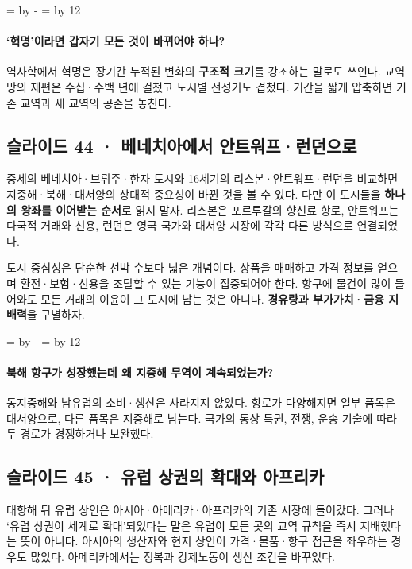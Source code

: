 \documentclass[10pt,a4paper]{article}
\newcommand{\ReserveQuestionSpace}{%
  \par\begingroup
  \dimen0=\pagegoal \advance\dimen0 by -\pagetotal
  \dimen2=\baselineskip \multiply\dimen2 by 12
  \ifdim\dimen0<\dimen2 \newpage\fi
  \endgroup}
\begin{document}
\ReserveQuestionSpace
\paragraph{‘혁명’이라면 갑자기 모든 것이 바뀌어야 하나?}
역사학에서 혁명은 장기간 누적된 변화의 \textbf{구조적 크기}를 강조하는 말로도 쓰인다. 교역망의 재편은 수십·수백 년에 걸쳤고 도시별 전성기도 겹쳤다. 기간을 짧게 압축하면 기존 교역과 새 교역의 공존을 놓친다.\par

\subsection{슬라이드 44 · 베네치아에서 안트워프·런던으로}
중세의 베네치아·브뤼주·한자 도시와 16세기의 리스본·안트워프·런던을 비교하면 지중해·북해·대서양의 상대적 중요성이 바뀐 것을 볼 수 있다. 다만 이 도시들을 \textbf{하나의 왕좌를 이어받는 순서}로 읽지 말자. 리스본은 포르투갈의 향신료 항로, 안트워프는 다국적 거래와 신용, 런던은 영국 국가와 대서양 시장에 각각 다른 방식으로 연결되었다.\par

도시 중심성은 단순한 선박 수보다 넓은 개념이다. 상품을 매매하고 가격 정보를 얻으며 환전·보험·신용을 조달할 수 있는 기능이 집중되어야 한다. 항구에 물건이 많이 들어와도 모든 거래의 이윤이 그 도시에 남는 것은 아니다. \textbf{경유량과 부가가치·금융 지배력}을 구별하자.\par

\ReserveQuestionSpace
\paragraph{북해 항구가 성장했는데 왜 지중해 무역이 계속되었는가?}
동지중해와 남유럽의 소비·생산은 사라지지 않았다. 항로가 다양해지면 일부 품목은 대서양으로, 다른 품목은 지중해로 남는다. 국가의 통상 특권, 전쟁, 운송 기술에 따라 두 경로가 경쟁하거나 보완했다.\par

\subsection{슬라이드 45 · 유럽 상권의 확대와 아프리카}
대항해 뒤 유럽 상인은 아시아·아메리카·아프리카의 기존 시장에 들어갔다. 그러나 ‘유럽 상권이 세계로 확대’되었다는 말은 유럽이 모든 곳의 교역 규칙을 즉시 지배했다는 뜻이 아니다. 아시아의 생산자와 현지 상인이 가격·물품·항구 접근을 좌우하는 경우도 많았다. 아메리카에서는 정복과 강제노동이 생산 조건을 바꾸었다.\par
\end{document}
